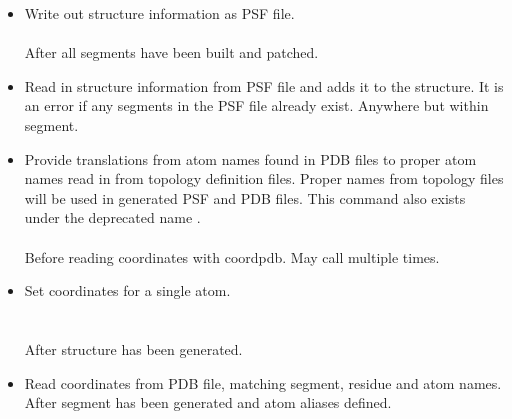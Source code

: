\begin{itemize}
\item {}
{Write out structure information as PSF file.}
{ \\
\\
}
{After all segments have been built and patched.}

\item {}
{Read in structure information from PSF file and adds it to the structure.
It is an error if any segments in the PSF file already exist.}
{}
{Anywhere but within segment.}

\item {}
{Provide translations from atom names found in PDB files to proper
atom names read in from topology definition files.  Proper names
from topology files will be used in generated PSF and PDB files.
This command also exists under the deprecated name .}
{\\
\\
}
{Before reading coordinates with coordpdb.  May call multiple times.}

\item {}
{Set coordinates for a single atom.}
{\\
\\
\\
}
{After structure has been generated.}

\item {}
{Read coordinates from PDB file, matching segment, residue and atom names.}
{\\
}
{After segment has been generated and atom aliases defined.}


\end{itemize}
